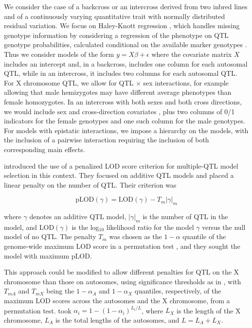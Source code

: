 \documentclass[12pt,letterpaper]{article}
\newcommand{\LOD}{\text{LOD}}
\newcommand{\pLOD}{\text{pLOD}}
\begin{document}
We consider the case of a backcross or an intercross derived from two
inbred lines and of a continuously varying quantitative trait with
normally distributed residual variation. We focus on Haley-Knott
regression \citep{Haley1992}, which handles missing genotype
information by considering a regression of the phenotype on QTL
genotype probabilities, calculated conditional on the available marker
genotypes \citep[see][]{Broman2009}. Thus we consider models of the
form $y = X\beta + \epsilon$ where the covariate matrix $X$ includes
an intercept and, in a backcross, includes one column for each autosomal
QTL, while in an intercross, it includes two columns for each autosomal
QTL. For X chromosome QTL, we allow for QTL $\times$ sex interactions,
for example allowing that male hemizygotes may have different average
phenotypes than female homozygotes. In an intercross with both sexes
and both cross directions, we would include sex and cross-direction
covariates \citep[see][]{Broman2006}, plus two columns of 0/1
indicators for the female genotypes and one such column for the male
genotypes. For models with epistatic interactions, we impose a hierarchy
on the models, with the inclusion of a pairwise interaction requiring
the inclusion of both corresponding main effects.

\citet{Broman2002} introduced the use of a penalized LOD score
criterion for multiple-QTL model selection in this context. They
focused on additive QTL models and placed a linear penalty on the
number of QTL. Their criterion was

$$\pLOD(\gamma) = \LOD(\gamma) - T_m|\gamma|_m$$

\noindent
where $\gamma$ denotes an additive QTL model, $|\gamma|_m$ is the
number of QTL in the model, and $\LOD(\gamma)$ is the log$_{10}$
likelihood ratio for the model $\gamma$ versus the null model of no
QTL. The penalty $T_m$ was chosen as the $1-\alpha$ quantile of the
genome-wide maximum LOD score in a permutation test
\citep[see][]{Churchill1994}, and they sought the model with maximum
pLOD.

This approach could be modified to allow different penalties for QTL
on the X chromosome than those on autosomes, using significance
thresholds as in \citet{Broman2006}, with $T_{mA}$ and $T_{mX}$ being
the $1-\alpha_A$ and $1-\alpha_X$ quantiles, respectively, of the
maximum LOD scores across the autosomes and the X chromosome, from
a permutation test. \citet{Broman2006} took $\alpha_i = 1
- (1-\alpha_i)^{L_i/L}$, where $L_X$ is the length of the X
chromosome, $L_A$ is the total lengths of the autosomes, and $L = L_A
+ L_X$.
\end{document}
